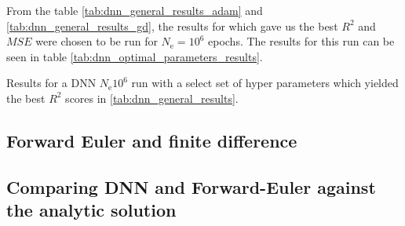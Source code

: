 From the table \ref{tab:dnn_general_results_adam} and \ref{tab:dnn_general_results_gd}, the results for which gave us the best $R^2$ and $MSE$ were chosen to be run for $N_\mathrm{e}=10^6$ epochs. The results for this run can be seen in table \ref{tab:dnn_optimal_parameters_results}.
\begin{table}[h!tb]
    \centering
    \caption{Results for a DNN $N_\mathrm{e}10^6$ run with a select set of hyper parameters which yielded the best $R^2$ scores in \ref{tab:dnn_general_results}.}
    \label{tab:dnn_optimal_parameters_results}
\end{table}

\subsection{Forward Euler and finite difference}


\subsection{Comparing DNN and Forward-Euler against the analytic solution}
